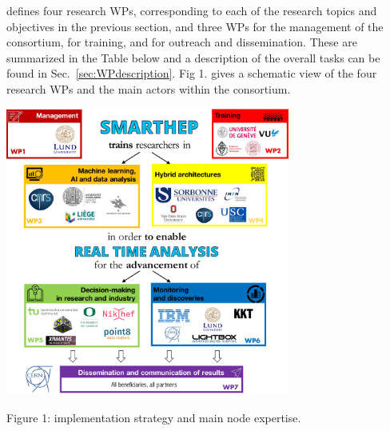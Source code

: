 \acronym defines four research WPs, corresponding to each of the research topics and objectives in the previous section, and three WPs for the management of the consortium, for training, and for outreach and dissemination. These are summarized in the Table below and a description of the overall tasks can be found in Sec.~\ref{sec:WPdescription}. Fig 1. gives a schematic view of the four research WPs and the main actors within the consortium. 

\begin{center}
\includegraphics[width=0.7\textwidth]{figs/NetworkCompositionCombinedImplementation} %
\begin{center}\footnotesize \label{fig:implementation}
Figure 1: \acronym implementation strategy and main node expertise.
\end{center}
\normalsize 
\vspace{-2mm}
\end{center}


